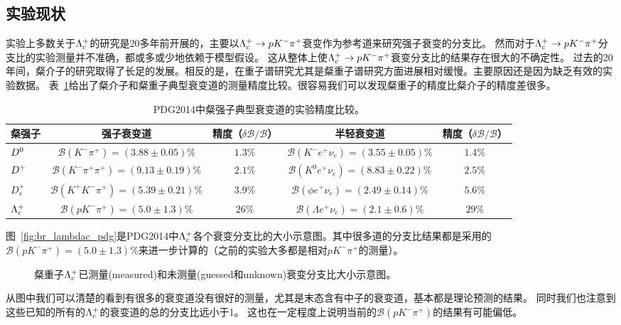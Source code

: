 \subsection{实验现状}

实验上多数关于$\Lambda_{c}^{+}$的研究是20多年前开展的，主要以$\Lambda_{c}^{+}\rightarrow pK^{-}\pi^+$衰变作为参考道来研究强子衰变的分支比。
然而对于$\Lambda_{c}^{+}\rightarrow pK^{-}\pi^+$分支比的实验测量并不准确，都或多或少地依赖于模型假设。
这从整体上使$\Lambda_{c}^{+}\rightarrow pK^{-}\pi^+$衰变分支比的结果存在很大的不确定性。
过去的20年间，粲介子的研究取得了长足的发展。相反的是，在重子谱研究尤其是粲重子谱研究方面进展相对缓慢。主要原因还是因为缺乏有效的实验数据。 
表~\ref{tab:compare_meason_baryon}给出了粲介子和粲重子典型衰变道的测量精度比较。很容易我们可以发现粲重子的精度比粲介子的精度差很多。
\begin{table}
\centering
\footnotesize
\caption{PDG2014中粲强子典型衰变道的实验精度比较。}
\begin{tabular}{l|cc|cc}
 \hline \hline
粲强子 & 强子衰变道 & 精度（$\delta \mathcal{B}/\mathcal{B}$）  & 半轻衰变道 & 精度（$\delta \mathcal{B}/\mathcal{B}$） \\
 \hline
${{D}^0}$     &  $\mathcal{B}(K^{-}\pi^{+})=(3.88\pm0.05)\%$         &  $1.3\%$ &  $\mathcal{B}(K^{-}e^{+}\nu_{e})=(3.55\pm0.05)\%$   &  $1.4\%$  \\
${{D}^+}$     &  $\mathcal{B}(K^{-}\pi^{+}\pi^{+})=(9.13\pm0.19)\%$  &  $2.1\%$ &  $\mathcal{B}(K^{0}e^{+}\nu_{e})=(8.83\pm0.22)\%$   &  $2.5\%$  \\
$D_{s}^{+}$  &  $\mathcal{B}(K^{+}K^{-}\pi^{+})=(5.39\pm0.21)\%$    &  $3.9\%$ &  $\mathcal{B}(\phi e^{+}\nu_{e})=(2.49\pm0.14)\%$   &  $5.6\%$  \\
 \hline
$\Lambda_{c}^{+}$  &  $\mathcal{B}(pK^{-}\pi^{+})=(5.0\pm1.3)\%$          &  $26\%$  &  $\mathcal{B}(\Lambda e^{+}\nu_{e})=(2.1\pm0.6)\%$  &  $29\%$   \\
 \hline \hline
\end{tabular}
\label{tab:compare_meason_baryon}
\end{table}
图~\ref{fig:br_lambdac_pdg}是PDG2014中$\Lambda_{c}^{+}$各个衰变分支比的大小示意图。其中很多道的分支比结果都是采用的$\mathcal{B}(pK^{-}\pi^{+})=(5.0\pm1.3)\%$来进一步计算的（之前的实验大多都是相对$pK^{-}\pi^{+}$的测量）。
\begin{figure}[!tbp]
 \centering
{}
\hspace{1pt}
 \caption{粲重子$\Lambda_{c}^{+}$已测量(measured)和未测量(guessed和unknown)衰变分支比大小示意图。}
 \label{fig:br_lambdac}
\end{figure}
从图中我们可以清楚的看到有很多的衰变道没有很好的测量，尤其是末态含有中子的衰变道，基本都是理论预测的结果。
同时我们也注意到这些已知的所有的$\Lambda_{c}^{+}$的衰变道的总的分支比远小于1。
这也在一定程度上说明当前的$\mathcal{B}(pK^{-}\pi^{+})$的结果有可能偏低。

